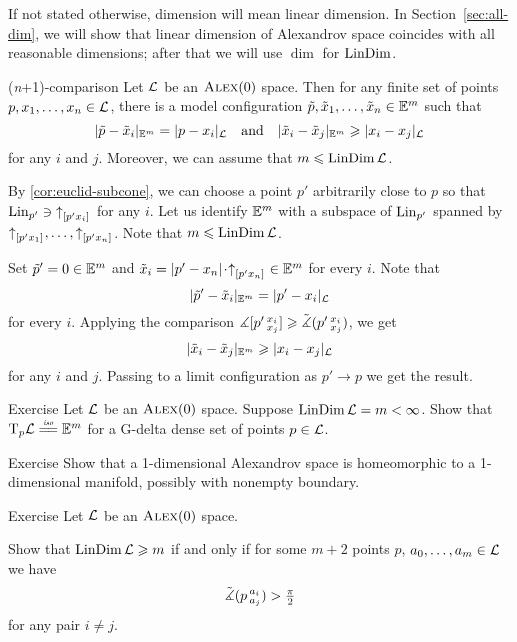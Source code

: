 If not stated otherwise, dimension will mean linear dimension.
In Section~\ref{sec:all-dim}, we will show that linear dimension of Alexandrov space coincides with all reasonable dimensions;
after that we will use $\dim$ for $\mathop{\rm LinDim}\nolimits$.

\begin{thm}{(\textit{n}+1)-comparison}
Let $\mathcal{L}$ be an $\textsc{Alex}(0)$ space.
Then for any finite set of points $p,x_1,\dots,x_n\in \mathcal{L}$, there is a model configuration 
$\tilde p,\tilde x_1,\dots,\tilde x_n\in \mathbb{E}^m$ such that 
\[|\tilde p-\tilde x_i|_{\mathbb{E}^m}=| p- x_i|_{\mathcal{L}}
\quad\text{and}\quad
|\tilde x_i-\tilde x_j|_{\mathbb{E}^m}\geqslant |x_i- x_j|_{\mathcal{L}}\]
for any $i$ and $j$.
Moreover, we can assume that $m\leqslant \mathop{\rm LinDim}\nolimits\mathcal{L}$. 
\end{thm}

By \ref{cor:euclid-subcone}, we can choose a point $p'$ arbitrarily close to $p$ so that 
$\mathop{\rm Lin}\nolimits_{p'}\ni {\uparrow}_{[{p'}{x_i}]_{{}}}$ for any $i$.
Let us identify $\mathbb{E}^m$ with a subspace of $\mathop{\rm Lin}\nolimits_{p'}$ spanned by ${\uparrow}_{[{p'}{x_1}]_{{}}},\dots,{\uparrow}_{[{p'}{x_n}]_{{}}}$.
Note that $m\leqslant \mathop{\rm LinDim}\nolimits\mathcal{L}$.

Set $\tilde p'=0\in \mathbb{E}^m$ and $\tilde x_i=\dist{p'}{x_n}{}\cdot\dir{p'}{x_n}\in \EE^m$ for every $i$.
Note that 
\[|\tilde p'-\tilde x_i|_{\mathbb{E}^m}=| p'- x_i|_{\mathcal{L}}\]
for every $i$.
Applying the comparison $\measuredangle[p'\,{}^{x_i}_{x_j}]\geqslant \tilde\measuredangle(p'\,{}^{x_i}_{x_j})$, we get
\[|\tilde x_i-\tilde x_j|_{\mathbb{E}^m}\geqslant |x_i- x_j|_{\mathcal{L}}\]
for any $i$ and $j$.
Passing to a limit configuration as $p'\to p$ we get the result.
\qeds

\begin{thm}{Exercise}\label{ex:tangent=Em}
Let $\mathcal{L}$ be an $\textsc{Alex}(0)$ space.
Suppose $\LinDim\spc{L}\z=m<\infty$.
Show that $\T_p\spc{L}\iso \EE^m$ for a G-delta dense set of points $p\in\mathcal{L}$.
\end{thm}

\begin{thm}{Exercise}\label{ex:dim=1}
Show that a 1-dimensional Alexandrov space is homeomorphic to a 1-dimensional manifold, possibly with nonempty boundary.
\end{thm}


\begin{thm}{Exercise}\label{ex:resporka}
Let $\mathcal{L}$ be an $\textsc{Alex}(0)$ space.

Show that $\mathop{\rm LinDim}\nolimits \mathcal{L}\geqslant m$ if and only if for some $m+2$ points $p$, $a_0,\z\dots, a_{m}\in \spc{L}$
we have
\[\tilde\measuredangle(p\,{}^{a_i}_{a_j})>\tfrac\pi2\]
for any pair $i\ne j$.
\end{thm}

